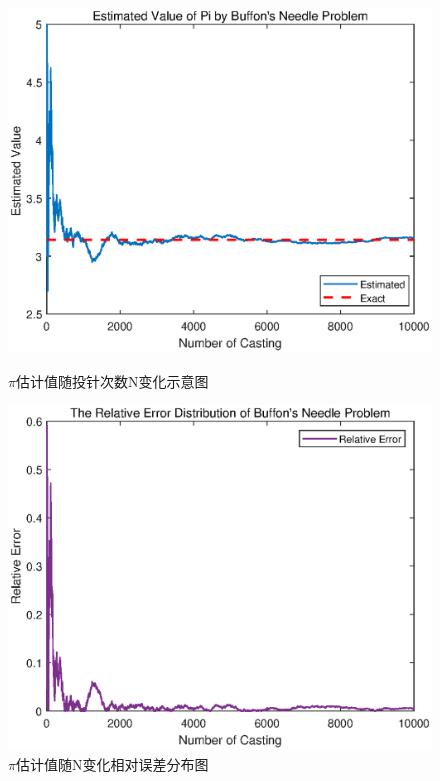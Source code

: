 \documentclass[12pt,a4paper]{article}%
\begin{document}
\begin{figure}[H]%
    \centering
    \begin{minipage}{0.48\textwidth}
        \centering
        \includegraphics[width=1.1\textwidth]{Pi_N.eps}
        \caption{\fontsize{10pt}{15pt}\selectfont $\pi$估计值随投针次数N变化示意图}
    \end{minipage}
    \hspace{0cm}%
    \hfill%
    \begin{minipage}{0.48\textwidth}
        \centering
        \includegraphics[width=1.1\textwidth]{Pi_N_Error.eps}
        \caption{\fontsize{10pt}{15pt}\selectfont $\pi$估计值随N变化相对误差分布图}
    \end{minipage}\label{fig:figure2}
\end{figure}
\end{document}
